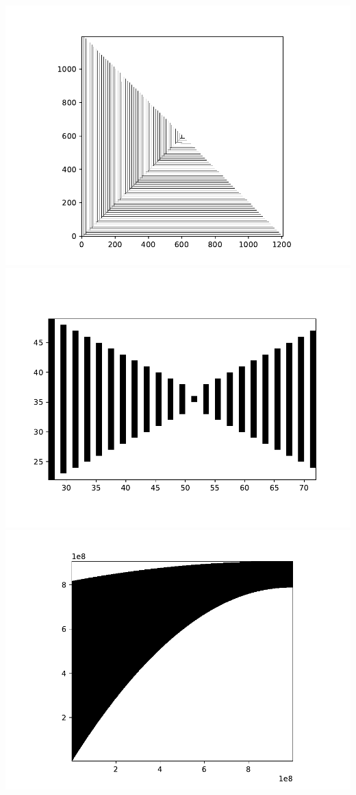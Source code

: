 \begin{frame}
    \frametitle{\problemtitle}
    \begin{overprint}
		\centering
		\includegraphics[height=0.8\textheight]{./visuals/1}
		\onslide<2>
		\centering
		\includegraphics[height=0.8\textheight]{./visuals/2}
		\onslide<3>
		\centering
		\includegraphics[height=0.8\textheight]{./visuals/3}

\end{overprint}
\end{frame}
